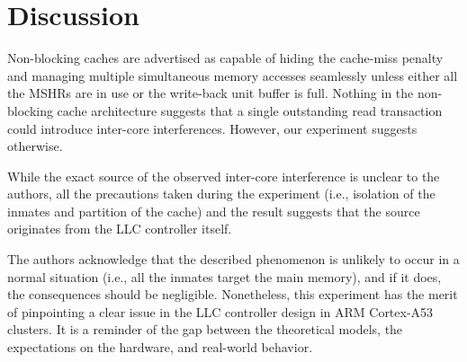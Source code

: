 \section{Discussion}
%
%

    Non-blocking caches are advertised as capable of hiding the cache-miss penalty and managing multiple simultaneous memory accesses seamlessly unless either all the MSHRs are in use or the write-back unit buffer is full.
    Nothing in the non-blocking cache architecture suggests that a single outstanding read transaction could introduce inter-core interferences. However, our experiment suggests otherwise.

    While the exact source of the observed inter-core interference is unclear to the authors, all the precautions taken during the experiment (i.e., isolation of the inmates and partition of the cache) and the result suggests that the source originates from the LLC controller itself.

    The authors acknowledge that the described phenomenon is unlikely to occur in a normal situation (i.e., all the inmates target the main memory), and if it does, the consequences should be negligible.
    Nonetheless, this experiment has the merit of pinpointing a clear issue in the LLC controller design in ARM Cortex-A53 clusters.
    It is a reminder of the gap between the theoretical models, the expectations on the hardware, and real-world behavior.


